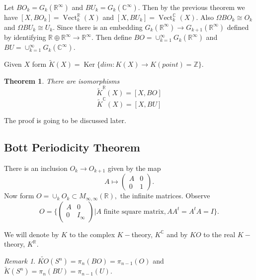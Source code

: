 \documentclass[a4paper,10pt]{article}
\theoremstyle{plain}%
\newtheorem{thm}{Theorem}
\theoremstyle{definition}
\theoremstyle{remark}
\newtheorem{rem}{Remark}
\newcommand{\ZZ}{\mathbb{Z}}
\newcommand{\RR}{\mathbb{R}}
\newcommand{\CC}{\mathbb{C}}
\DeclareMathOperator{\Vect}{Vect}
\DeclareMathOperator{\Ker}{Ker}
\begin{document}
Let $BO_k = G_k(\RR^\infty)$ and $BU_k = G_k(\CC^\infty)$. Then by the previous theorem we have $[X,BO_k]= \Vect_k^\RR(X)$ and $[X,BU_k]= \Vect_k^\CC(X)$.  Also $\Omega BO_k \cong O_k$ and $\Omega BU_k \cong U_k.$  Since there is an embedding $G_k(\RR^\infty)\to G_{k+1}(\RR^\infty)$ defined by identifying $\RR\oplus\RR^\infty\to \RR^\infty.$ Then define $BO = \cup_{k=1}^\infty G_k(\RR^\infty)$ and $BU = \cup_{k=1}^\infty G_k(\CC^\infty)$.

Given $X$ form $\tilde{K}(X) = \Ker\{dim:K(X)\to K(point) = \ZZ\}.$

\begin{thm}
There are isomorphisms
\[
\tilde{K}^\RR(X) = [X, BO]
\]
\[
\tilde{K}^\CC(X) = [X, BU]
\]
\end{thm}

The proof is going to be discussed later.

\subsection{Bott Periodicity Theorem}

There is an inclusion $O_k\to O_{k+1}$ given by the map
\[A\mapsto \left( 
\begin{array}{cc}
A & 0 \\
0 & 1 
\end{array} \right).\] 
Now form $O = \cup_k O_k\subset M_{\infty,\infty}(\RR),$ the infinite matrices. Observe 
\[O=\bigg\{\left( 
\begin{array}{cc}
A & 0 \\
0 & I_\infty 
\end{array} \right) \bigg| A \text{ finite square matrix}, AA^t = A^tA = I\bigg\}.\] 

We will denote by $K$ to the complex $K-$theory, $K^\CC$ and by $KO$ to the real $K-$theory, $K^\RR.$
\begin{rem}
$\tilde{KO}(S^n) = \pi_n (BO)= \pi_{n-1} (O)$ and
$\tilde{K}(S^n) = \pi_n (BU)= \pi_{n-1} (U).$
\end{rem}
\end{document}
